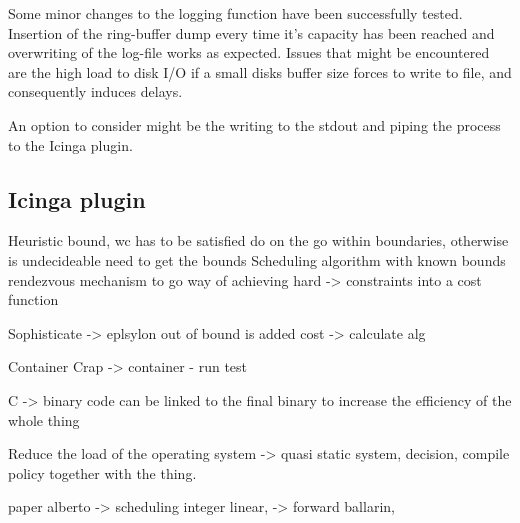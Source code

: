 \documentclass[]{scrartcl}
\begin{document}
Some minor changes to the logging function have been successfully tested. Insertion of the ring-buffer dump every time it's capacity has been reached and overwriting of the log-file works as expected.
Issues that might be encountered are the high load to disk I/O if a small disks buffer size forces to write to file, and consequently induces delays.

An option to consider might be the writing to the stdout and piping the process to the Icinga plugin. 


\subsection{Icinga plugin}





Heuristic bound, wc has to be satisfied
do on the go within boundaries, otherwise is undecideable
need to get the bounds
Scheduling algorithm with known bounds
rendezvous mechanism to go 
way of achieving hard 
-> constraints into a cost function


Sophisticate -> eplsylon out of bound is added cost -> calculate alg

Container
Crap -> container - run test

C -> binary code can be linked to the final binary to increase the efficiency of the whole thing

Reduce the load of the operating system -> quasi static system, decision, compile policy together with the thing.

paper alberto -> scheduling integer linear,
-> forward 
ballarin, 
\end{document}
